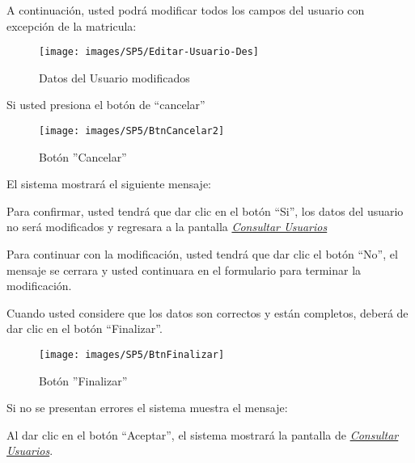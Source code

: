                 A continuación, usted podrá modificar todos los campos del usuario con excepción de la matricula:
                \begin{figure}[!hbtp]
                    \centering
                    \hypertarget{modif}{\texttt{[image: images/SP5/Editar-Usuario-Des]}}
                    \caption{Datos del Usuario modificados}
                    \label{modif}
                \end{figure}
                
                Si usted presiona el botón de “cancelar”
                
                \begin{figure}[!hbtp]
                    \centering
                    \hypertarget{cancel2}{\texttt{[image: images/SP5/BtnCancelar2]}}
                    \caption{Botón ''Cancelar''}
                    \label{cancel2}
                \end{figure}
                
                El sistema mostrará el siguiente mensaje:
                
                Para confirmar, usted tendrá que dar clic en el botón “Si”, los datos del usuario no será modificados  y regresara a la pantalla \hyperlink{consultarUs}{\textit{Consultar Usuarios}}
            
                Para continuar con la modificación, usted tendrá que  dar clic el botón “No”, el mensaje se cerrara y usted continuara en el formulario para terminar la modificación.
                
                Cuando usted considere que los datos son correctos y están completos, deberá de dar clic en el botón “Finalizar”.
                \begin{figure}[!hbtp]
                    \centering
                    \hypertarget{btnfin}{\texttt{[image: images/SP5/BtnFinalizar]}}
                    \caption{Botón ''Finalizar''}
                    \label{btnfin}
                \end{figure}
                
                Si no se presentan errores el sistema muestra el mensaje:
                
                Al dar clic en el botón “Aceptar”, el sistema mostrará la pantalla de \hyperlink{consultarUs}{\textit{Consultar Usuarios}}.
                
